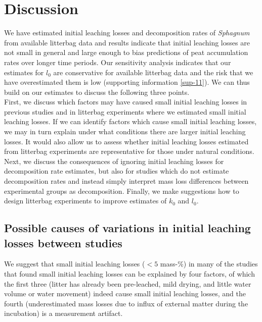 \documentclass[
  12pt,
]{article}
\begin{document}
\hypertarget{discussion}{%
\section{Discussion}\label{discussion}}

We have estimated initial leaching losses and decomposition rates of \emph{Sphagnum} from available litterbag data and results indicate that initial leaching losses are not small in general and large enough to bias predictions of peat accumulation rates over longer time periods. Our sensitivity analysis indicates that our estimates for \(l_0\) are conservative for available litterbag data and the risk that we have overestimated them is low (supporting information \ref{sup-11}). We can thus build on our estimates to discuss the following three points.\\
First, we discuss which factors may have caused small initial leaching losses in previous studies and in litterbag experiments where we estimated small initial leaching losses. If we can identify factors which cause small initial leaching losses, we may in turn explain under what conditions there are larger initial leaching losses. It would also allow us to assess whether initial leaching losses estimated from litterbag experiments are representative for those under natural conditions. Next, we discuss the consequences of ignoring initial leaching losses for decomposition rate estimates, but also for studies which do not estimate decomposition rates and instead simply interpret mass loss differences between experimental groups as decomposition. Finally, we make suggestions how to design litterbag experiments to improve estimates of \(k_0\) and \(l_0\).

\hypertarget{out-discussion-2}{%
\subsection{Possible causes of variations in initial leaching losses between studies}\label{out-discussion-2}}

We suggest that small initial leaching losses (\(<5\) mass-\%) in many of the studies that found small initial leaching losses can be explained by four factors, of which the first three (litter has already been pre-leached, mild drying, and little water volume or water movement) indeed cause small initial leaching losses, and the fourth (underestimated mass losses due to influx of external matter during the incubation) is a measurement artifact.
\end{document}
